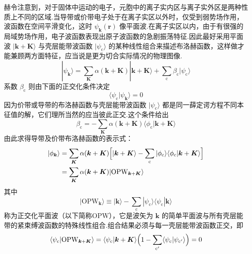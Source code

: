 赫令注意到，对于固体中运动的电子，元胞中的离子实内区与离子实外区是两种性质上不同的区域.当导带或价带电子处于在离子实区以外时，仅受到弱势场作用，波函数在空间平滑变化，这时 $\psi_{\boldsymbol{k}}(\boldsymbol{r})$ 像平面波.在离子实区以内，由于有很强的局域势场作用，电子波函数表现出原子波函数的急剧振荡特征.因此最好采用平面波 $|\boldsymbol{k}+\boldsymbol{K}\rangle$ 与壳层能带波函数 $|\psi_{\mathrm{c}}\rangle$ 的某种线性组合来描述布洛赫函数，这样做才能兼顾两方面特征，应当说是更为切合实际情况的物理图像.
\begin{equation}
  |\psi_{\boldsymbol{k}}\rangle=\sum_{\boldsymbol{K}}\alpha(\boldsymbol{k}+\boldsymbol{K})|\boldsymbol{k}+\boldsymbol{K}\rangle+\sum_{\mathrm{c}}\beta_{\mathrm{c}}|\psi_{\mathrm{c}}\rangle
\end{equation}
系数 $\beta_{\mathrm{c}}$ 则由下面的正交化条件决定
\begin{equation}
  \langle\psi_{\mathrm{c}}|\psi_{\boldsymbol{k}}\rangle=0
\end{equation}
因为价带或导带的布洛赫函数与壳层能带波函数 $|\psi_{\mathrm{c}}\rangle$ 都是同一薛定谔方程不同本征值的解，它们理所当然的应当彼此正交.这个条件给出
\begin{equation}
  \beta_{\mathrm{c}}=-\sum_{\boldsymbol{K}}\alpha(\boldsymbol{k}+\boldsymbol{K})\langle\phi_{\mathrm{c}}|\boldsymbol{k}+\boldsymbol{K}\rangle
\end{equation}
由此求得导带及价带布洛赫函数的表示式：
\begin{equation}
\begin{aligned}
  |\phi_{\boldsymbol{k}}\rangle
  &=\sum_{\boldsymbol{K}}\alpha(\boldsymbol{k}+\boldsymbol{K})\Bigl[|\boldsymbol{k}+\boldsymbol{K}\rangle-\sum_{\mathrm{c}}|\phi_{\mathrm{c}}\rangle\langle\phi_{\mathrm{c}}|\boldsymbol{k}+\boldsymbol{K}\rangle\Bigr]\\
  &=\sum_{\boldsymbol{K}}\alpha(\boldsymbol{k}+\boldsymbol{K})|\mathrm{OPW}_{\boldsymbol{k}+\boldsymbol{K}}\rangle
\end{aligned}
\end{equation}
其中
\begin{equation}
  |\mathrm{OPW}_{\boldsymbol{k}}\rangle\equiv|\boldsymbol{k}\rangle-\sum_{\mathrm{c}}|\psi_{\mathrm{c}}\rangle\langle\psi_{\mathrm{c}}|\boldsymbol{k}\rangle
\end{equation}
称为正交化平面波（以下简称OPW），它是波矢为 $\boldsymbol{k}$ 的简单平面波与所有壳层能带的紧束缚波函数的特殊线性组合.组合结果必须与每一壳层能带波函数正交，即
\begin{equation}
  \langle\psi_{\mathrm{c}}|\mathrm{OPW}_{\boldsymbol{k}+\boldsymbol{K}}\rangle
  =\langle\psi_{\mathrm{c}}|\boldsymbol{k}+\boldsymbol{K}\rangle\Bigl(1-\sum_{\mathrm{c}'}\langle\psi_{\mathrm{c}}|\psi_{\mathrm{c}'}\rangle\Bigr)=0
\end{equation}
